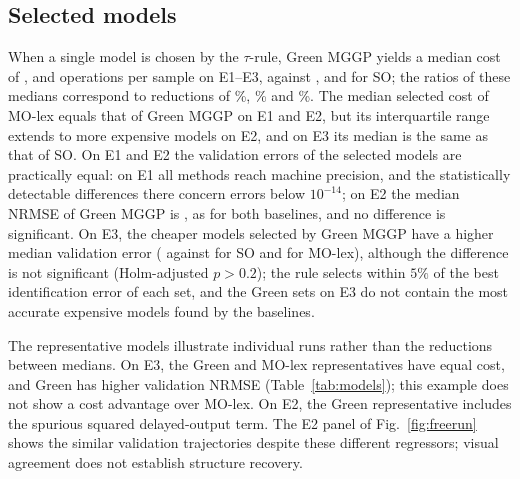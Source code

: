 \subsection{Selected models}
When a single model is chosen by the $\tau$-rule, Green MGGP yields a median cost of \EBGreenCsel, \ECGreenCsel{} and
\EDGreenCsel{} operations per sample on E1--E3, against \EBSOCsel, \ECSOCsel{} and \EDSOCsel{} for SO; the ratios of these
medians correspond to reductions of \EBCostRatioSO\%, \ECCostRatioSO\% and \EDCostRatioSO\%. The median selected cost
of MO-lex equals that of Green MGGP on E1 and E2, but its interquartile range extends to more expensive models on E2,
and on E3 its median is the same as that of SO. On E1 and E2 the validation errors of the selected models are
practically equal: on E1 all methods reach machine precision, and the statistically detectable differences there
concern errors below $10^{-14}$; on E2 the median NRMSE of Green MGGP is \ECGreenVALsel, as for both baselines, and
no difference is significant. On E3, the cheaper models selected by Green MGGP have a higher median validation error
(\EDGreenVALsel{} against \EDSOVALsel{} for SO and \EDLexVALsel{} for MO-lex), although the difference is not
significant (Holm-adjusted $p>0.2$); the rule selects within $5\%$ of the best identification error of each set, and
the Green sets on E3 do not contain the most accurate expensive models found by the baselines.



The representative models illustrate individual runs rather than the reductions between medians. On E3, the Green and MO-lex representatives have equal cost, and Green has higher validation NRMSE (Table~\ref{tab:models}); this example does not show a cost advantage over MO-lex. On E2, the Green representative includes the spurious squared delayed-output term. The E2 panel of Fig.~\ref{fig:freerun} shows the similar validation trajectories despite these different regressors; visual agreement does not establish structure recovery.

